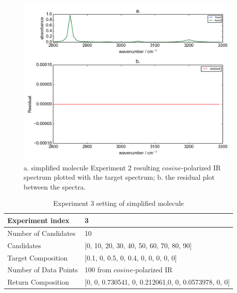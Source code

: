 \begin{figure}[!ht] 
\includegraphics[scale=0.7]{Figures/toy_model_result_plotting_ir_cos_4candi_1.png}
\caption{a. simplified molecule Experiment 2 resulting $cosine$-polarized IR spectrum plotted with the target spectrum; b. the residual plot between the spectra.}
\label{fig:3.2}
\end{figure}

\begin{table} 
\begin{tabular}{| l | p{7cm} | }
\hline
Experiment index & 3  \\
\hline
Number of Candidates & 10   \\
\hline
Candidates & [0, 10, 20, 30, 40, 50, 60, 70, 80, 90]  \\
\hline
Target Composition & [0.1, 0, 0.5, 0, 0.4, 0, 0, 0, 0, 0] \\
\hline
Number of Data Points & 100 from $cosine$-polarized IR \\
\hline
Return Composition & [0, 0, 0.730541, 0, 0.212061,0, 0, 0.0573978, 0, 0] \\
\hline
\end{tabular}
\caption{Experiment 3 setting of simplified molecule}
\label{tab:3.2}
\end{table}	


